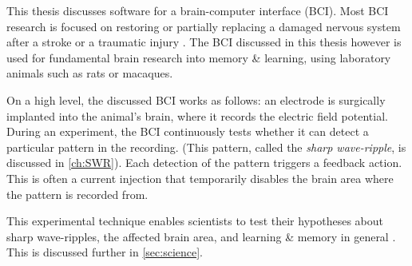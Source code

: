 
\label{sec:BCI}

This thesis discusses software for a brain-computer interface (BCI).\footnotemark{} Most BCI research is focused on restoring or partially replacing a damaged nervous system after a stroke or a traumatic injury \cite{Krucoff2016}. The BCI discussed in this thesis however is used for fundamental brain research into memory \& learning, using laboratory animals such as rats or macaques.


On a high level, the discussed BCI works as follows: an electrode is surgically implanted into the animal's brain, where it records the electric field potential. During an experiment, the BCI continuously tests whether it can detect a particular pattern in the recording. (This pattern, called the \emph{sharp wave-ripple}, is discussed in \cref{ch:SWR}). Each detection of the pattern triggers a feedback action. This is often a current injection that temporarily disables the brain area where the pattern is recorded from.

This experimental technique enables scientists to test their hypotheses about sharp wave-ripples, the affected brain area, and learning \& memory in general \cite{Ego-Stengel2009,Girardeau2009,Jadhav2012,Girardeau2014,Talakoub2016}. This is discussed further in \cref{sec:science}.


